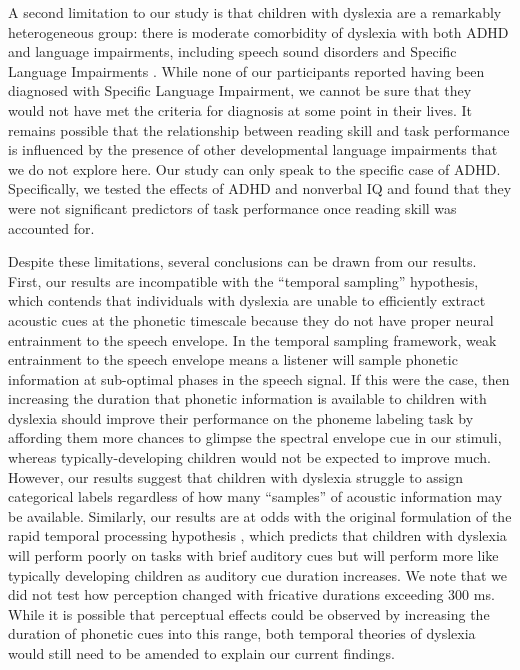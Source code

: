 \documentclass[../uwthesis.tex]{subfiles}
\begin{document}
A second limitation to our study is that children with dyslexia are a remarkably heterogeneous group: there is moderate comorbidity of dyslexia with both ADHD and language impairments, including speech sound disorders and Specific Language Impairments \citep{Germano2010, Pennington2006,Stevenson2005}. While none of our participants reported having been diagnosed with Specific Language Impairment, we cannot be sure that they would not have met the criteria for diagnosis at some point in their lives. It remains possible that the relationship between reading skill and task performance is influenced by the presence of other developmental language impairments that we do not explore here. Our study can only speak to the specific case of ADHD. Specifically, we tested the effects of ADHD and nonverbal IQ and found that they were not significant predictors of task performance once reading skill was accounted for. 

Despite these limitations, several conclusions can be drawn from our results. First, our results are incompatible with the “temporal sampling” hypothesis, which contends that individuals with dyslexia are unable to efficiently extract acoustic cues at the phonetic timescale because they do not have proper neural entrainment to the speech envelope. In the temporal sampling framework, weak entrainment to the speech envelope means a listener will sample phonetic information at sub-optimal phases in the speech signal. If this were the case, then increasing the duration that phonetic information is available to children with dyslexia should improve their performance on the phoneme labeling task by affording them more chances to glimpse the spectral envelope cue in our stimuli, whereas typically-developing children would not be expected to improve much. However, our results suggest that children with dyslexia struggle to assign categorical labels regardless of how many “samples” of acoustic information may be available. Similarly, our results are at odds with the original formulation of the rapid temporal processing hypothesis \citep{Tallal1980}, which predicts that children with dyslexia will perform poorly on tasks with brief auditory cues but will perform more like typically developing children as auditory cue duration increases. We note that we did not test how perception changed with fricative durations exceeding 300 ms. While it is possible that perceptual effects could be observed by increasing the duration of phonetic cues into this range, both temporal theories of dyslexia \citep{Goswami2011,Tallal1996} would still need to be amended to explain our current findings. 
\end{document}
